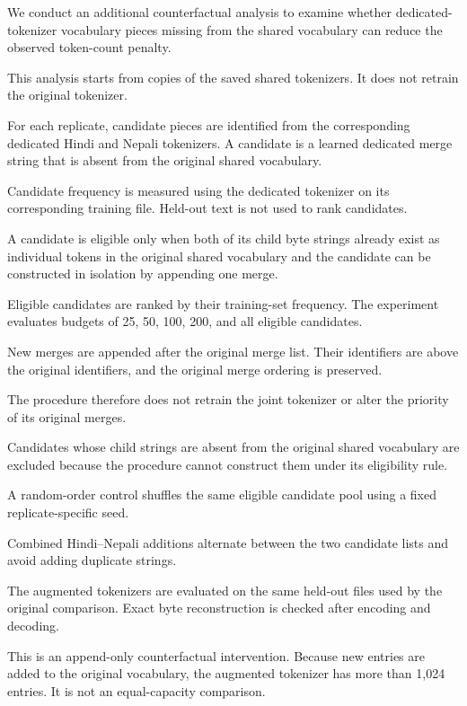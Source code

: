 \documentclass[10pt,twocolumn]{article}
\begin{document}
We conduct an additional counterfactual analysis to
examine whether dedicated-tokenizer vocabulary pieces
missing from the shared vocabulary can reduce the
observed token-count penalty.

This analysis starts from copies of the saved shared
tokenizers. It does not retrain the original tokenizer.

For each replicate, candidate pieces are identified
from the corresponding dedicated Hindi and Nepali
tokenizers. A candidate is a learned dedicated merge
string that is absent from the original shared
vocabulary.

Candidate frequency is measured using the dedicated
tokenizer on its corresponding training file.
Held-out text is not used to rank candidates.

A candidate is eligible only when both of its child
byte strings already exist as individual tokens in
the original shared vocabulary and the candidate can
be constructed in isolation by appending one merge.

Eligible candidates are ranked by their training-set
frequency. The experiment evaluates budgets of 25,
50, 100, 200, and all eligible candidates.

New merges are appended after the original merge list.
Their identifiers are above the original identifiers,
and the original merge ordering is preserved.

The procedure therefore does not retrain the joint
tokenizer or alter the priority of its original merges.

Candidates whose child strings are absent from the
original shared vocabulary are excluded because the
procedure cannot construct them under its eligibility
rule.

A random-order control shuffles the same eligible
candidate pool using a fixed replicate-specific seed.

Combined Hindi--Nepali additions alternate between
the two candidate lists and avoid adding duplicate
strings.

The augmented tokenizers are evaluated on the same
held-out files used by the original comparison.
Exact byte reconstruction is checked after encoding
and decoding.

This is an append-only counterfactual intervention.
Because new entries are added to the original vocabulary,
the augmented tokenizer has more than 1,024 entries.
It is not an equal-capacity comparison.

\end{document}
